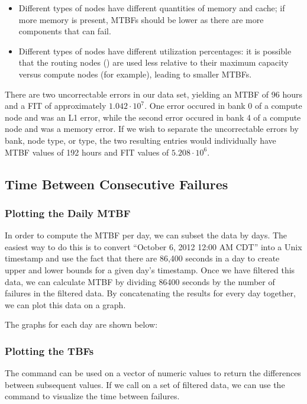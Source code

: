 \begin{itemize}
\item Different types of nodes have different quantities of memory and cache; if more memory is present, MTBFs should be lower as there are more components that can fail.
\item Different types of nodes have different utilization percentages: it is possible that the routing nodes () are used less relative to their maximum capacity versus compute nodes (for example), leading to smaller MTBFs.
\end{itemize}

There are two uncorrectable errors in our data set, yielding an MTBF of 96 hours and a FIT of approximately $1.042 \cdot 10^7$.  One error occured in bank 0 of a compute node and was an L1 error, while the second error occured in bank 4 of a compute node and was a memory error.  If we wish to separate the uncorrectable errors by bank, node type, or type, the two resulting entries would individually have MTBF values of 192 hours and FIT values of $5.208 \cdot 10^6$.

\subsection{Time Between Consecutive Failures}
\subsubsection{Plotting the Daily MTBF}

In order to compute the MTBF per day, we can subset the data by days.  The easiest way to do this is to convert ``October 6, 2012 12:00 AM CDT'' into a Unix timestamp and use the fact that there are 86,400 seconds in a day to create upper and lower bounds for a given day's timestamp.  Once we have filtered this data, we can calculate MTBF by dividing 86400 seconds by the number of failures in the filtered data.  By concatenating the results for every day together, we can plot this data on a graph.

The graphs for each day are shown below:

\subsubsection{Plotting the TBFs}

The  command can be used on a vector of numeric values to return the differences between subsequent values.  If we call  on a set of filtered data, we can use the  command to visualize the time between failures.

